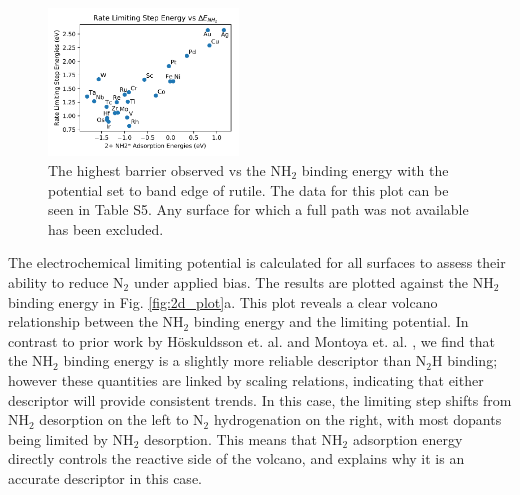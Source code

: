 \begin{figure}
    \centering
    \includegraphics[width=0.45\textwidth]{Images/NH2_v_rate_limiting.pdf}

    \caption{The highest barrier observed vs the NH$_2$ binding energy with the potential set to band edge of rutile. The data for this plot can be seen in Table S5. Any surface for which a full path was not available has been excluded.}
    \label{fig:NH2_thermo}
    
\end{figure}


The electrochemical limiting potential is calculated for all surfaces to assess their ability to reduce N$_2$ under applied bias. The results are plotted against the NH$_2$ binding energy in Fig. \ref{fig:2d_plot}a. This plot reveals a clear volcano relationship between the NH$_2$ binding energy and the limiting potential.
In contrast to prior work by H\"oskuldsson et. al.\cite{Hoskuldsson_2017} and Montoya et. al. \cite{Montoya_2015}, we find that the NH$_2$ binding energy is a slightly more reliable descriptor than N$_2$H binding; however these quantities are linked by scaling relations, indicating that either descriptor will provide consistent trends. In this case, the limiting step shifts from NH$_2$ desorption on the left to N$_2$ hydrogenation on the right, with most dopants being limited by NH$_2$ desorption. This means that NH$_2$ adsorption energy directly controls the reactive side of the volcano, and explains why it is an accurate descriptor in this case. 

